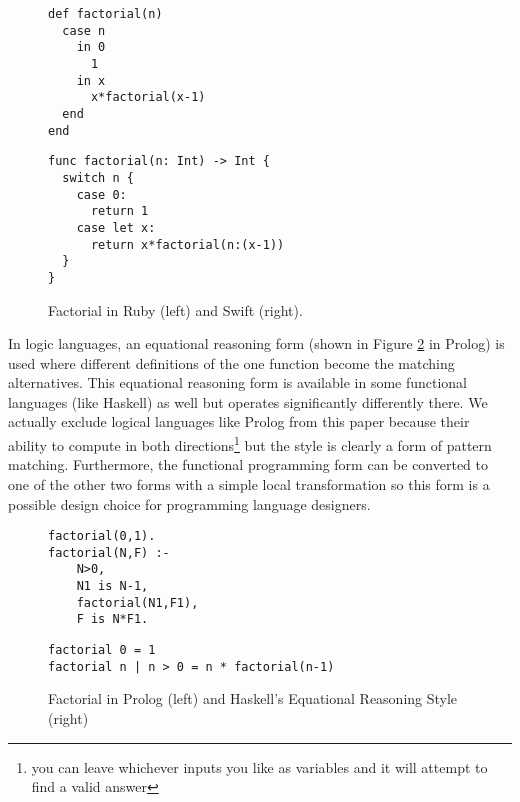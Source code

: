 \documentclass[acmsmall]{acmart}
\begin{document}
\begin{figure}
\hspace{-2em}
\begin{minipage}[t]{0.35\linewidth}
\begin{lstlisting}
def factorial(n)
  case n
    in 0
      1
    in x
      x*factorial(x-1)
  end
end   
\end{lstlisting}
\end{minipage}\hspace{2em}
\begin{minipage}[t]{0.55\linewidth}
\begin{lstlisting}
func factorial(n: Int) -> Int {
  switch n {
    case 0:
      return 1
    case let x:
      return x*factorial(n:(x-1))
  }
}
\end{lstlisting}
\end{minipage}
\caption{Factorial in Ruby (left) and Swift (right).}
\label{lst:ruby_swift}
\end{figure}


In logic languages, an equational reasoning form (shown in Figure \ref{lst:prolog} in Prolog) is used where different definitions of the one function become the matching alternatives.  This equational reasoning form is available in some functional languages (like Haskell) as well but operates significantly differently there.  We actually exclude logical languages like Prolog from this paper because their ability to compute in both directions\footnote{you can leave whichever inputs you like as variables and it will attempt to find a valid answer} but the style is clearly a form of pattern matching.  Furthermore, the functional programming form can be converted to one of the other two forms with a simple local transformation so this form is a possible design choice for programming language designers.
\begin{figure}
\begin{minipage}[t]{0.35\linewidth}
\begin{lstlisting}
factorial(0,1).
factorial(N,F) :-
    N>0,
    N1 is N-1,
    factorial(N1,F1),
    F is N*F1.
\end{lstlisting}
\end{minipage}
\begin{minipage}[t]{0.55\linewidth}
\begin{lstlisting}
factorial 0 = 1
factorial n | n > 0 = n * factorial(n-1)
\end{lstlisting}
\end{minipage}
\caption{Factorial in Prolog (left) and Haskell's Equational Reasoning Style (right) }
\label{lst:prolog}
\end{figure}
\end{document}
